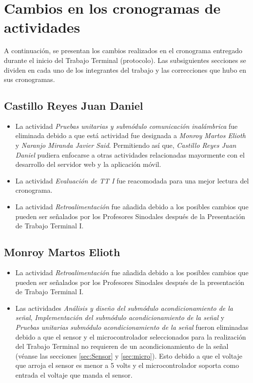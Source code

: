\section{Cambios en los cronogramas de actividades}
A continuación, se presentan los cambios realizados en el cronograma entregado durante el inicio del Trabajo Terminal (protocolo). Las subsiguientes secciones se dividen en cada uno de los integrantes del trabajo y las correcciones que hubo en sus cronogramas.
\subsection{Castillo Reyes Juan Daniel}
\begin{itemize}
	\item La actividad \textit{Pruebas unitarias y submódulo comunicación inalámbrica} fue eliminada debido a que está actividad fue designada a \textit{Monroy Martos Elioth} y \textit{Naranjo Miranda Javier Said}. Permitiendo así que, \textit{Castillo Reyes Juan Daniel} pudiera enfocarse a otras actividades relacionadas mayormente con el desarrollo del servidor web y la aplicación móvil.
	\item La actividad \textit{Evaluación de TT I} fue reacomodada para una mejor lectura del cronograma.
	\item La actividad \textit{Retroalimentación} fue añadida debido a los posibles cambios que pueden ser señalados por los Profesores Sinodales después de la Presentación de Trabajo Terminal I.
\end{itemize}
\subsection{Monroy Martos Elioth}
\begin{itemize}
	\item La actividad \textit{Retroalimentación} fue añadida debido a los posibles cambios que pueden ser señalados por los Profesores Sinodales después de la presentación de Trabajo Terminal I.
	\item Las actividades \textit{Análisis y diseño del submódulo acondicionamiento de la señal}, \textit{Implementación del submódulo acondicionamiento de la señal} y \textit{Pruebas unitarias submódulo acondicionamiento de la señal} fueron eliminadas debido a que el sensor y el microcontrolador seleccionados para la realización del Trabajo Terminal no requieren de un acondicionamiento de la señal (véanse las secciones \ref{sec:Sensor} y \ref{sec:micro}). Esto debido a que el voltaje que arroja el sensor es menor a 5 volts y el microcontrolador soporta como entrada el voltaje que manda el sensor.
\end{itemize}
